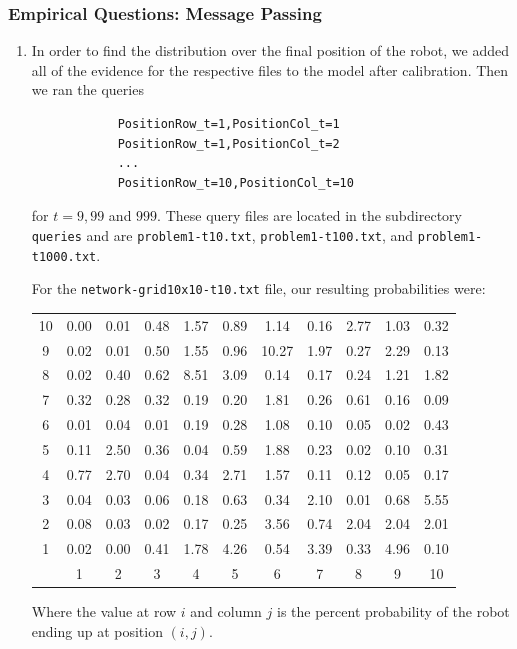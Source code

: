 \documentclass[11pt,a4paper]{article}
\begin{document}
	\setcounter{subsubsection}{4}
	\subsubsection{Empirical Questions: Message Passing}
	
	\begin{enumerate}
		\item In order to find the distribution over the final position of the robot, we added
		all of the evidence for the respective files to the model after calibration. Then we ran
		the queries
		\begin{verbatim}
		    PositionRow_t=1,PositionCol_t=1
		    PositionRow_t=1,PositionCol_t=2
		    ...
		    PositionRow_t=10,PositionCol_t=10
		\end{verbatim}
		for $t = 9, 99$ and $999$. These query files are located in the subdirectory
		{\tt queries} and are {\tt problem1-t10.txt},  {\tt problem1-t100.txt}, and
		{\tt problem1-t1000.txt}.
		
		For the {\tt network-grid10x10-t10.txt} file, our resulting probabilities were:
		\begin{center}
			\begin{tabular}{|c|cccccccccc|}
				\hline
				10 & 0.00 & 0.01 & 0.48 & 1.57 & 0.89 & 1.14 & 0.16 & 2.77 & 1.03 & 0.32 \\
				9 & 0.02 & 0.01 & 0.50 & 1.55 & 0.96 & 10.27 & 1.97 & 0.27 & 2.29 & 0.13 \\
				8 & 0.02 & 0.40 & 0.62 & 8.51 & 3.09 & 0.14 & 0.17 & 0.24 & 1.21 & 1.82 \\
				7 &0.32 & 0.28 & 0.32 & 0.19 & 0.20 & 1.81 & 0.26 & 0.61 & 0.16 & 0.09 \\
				6 & 0.01 & 0.04 & 0.01 & 0.19 & 0.28 & 1.08 & 0.10 & 0.05 & 0.02 & 0.43 \\
				5 & 0.11 & 2.50 & 0.36 & 0.04 & 0.59 & 1.88 & 0.23 & 0.02 & 0.10 & 0.31 \\
				4 & 0.77 & 2.70 & 0.04 & 0.34 & 2.71 & 1.57 & 0.11 & 0.12 & 0.05 & 0.17 \\
				3 & 0.04 & 0.03 & 0.06 & 0.18 & 0.63 & 0.34 & 2.10 & 0.01 & 0.68 & 5.55 \\
				2 & 0.08 & 0.03 & 0.02 & 0.17 & 0.25 & 3.56 & 0.74 & 2.04 & 2.04 & 2.01 \\
				1 & 0.02 & 0.00 & 0.41 & 1.78 & 4.26 & 0.54 & 3.39 & 0.33 & 4.96 & 0.10 \\
				\hline
				 & 1 & 2 & 3 & 4 & 5 & 6 & 7 & 8 & 9 & 10 \\
				 \hline
			\end{tabular}
		\end{center}
		Where the value at row $i$ and column $j$ is the percent probability of the
		robot ending up at position $(i,j)$.


\end{enumerate}
\end{document}
